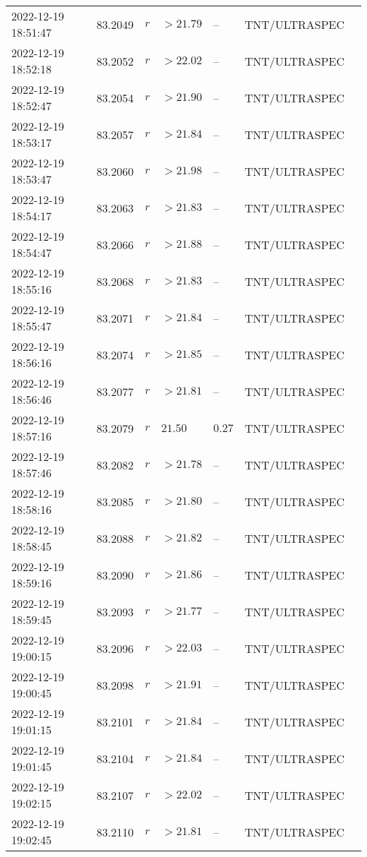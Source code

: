 \documentclass{nature_plusfigure}
\begin{document}
\begin{supplement}
\begin{center}
\begin{longtable}{lllllll}
2022-12-19 18:51:47 & 83.2049 & $r$ & $>21.79$ & -- & TNT/ULTRASPEC &  \\ 
2022-12-19 18:52:18 & 83.2052 & $r$ & $>22.02$ & -- & TNT/ULTRASPEC &  \\ 
2022-12-19 18:52:47 & 83.2054 & $r$ & $>21.90$ & -- & TNT/ULTRASPEC &  \\ 
2022-12-19 18:53:17 & 83.2057 & $r$ & $>21.84$ & -- & TNT/ULTRASPEC &  \\ 
2022-12-19 18:53:47 & 83.2060 & $r$ & $>21.98$ & -- & TNT/ULTRASPEC &  \\ 
2022-12-19 18:54:17 & 83.2063 & $r$ & $>21.83$ & -- & TNT/ULTRASPEC &  \\ 
2022-12-19 18:54:47 & 83.2066 & $r$ & $>21.88$ & -- & TNT/ULTRASPEC &  \\ 
2022-12-19 18:55:16 & 83.2068 & $r$ & $>21.83$ & -- & TNT/ULTRASPEC &  \\ 
2022-12-19 18:55:47 & 83.2071 & $r$ & $>21.84$ & -- & TNT/ULTRASPEC &  \\ 
2022-12-19 18:56:16 & 83.2074 & $r$ & $>21.85$ & -- & TNT/ULTRASPEC &  \\ 
2022-12-19 18:56:46 & 83.2077 & $r$ & $>21.81$ & -- & TNT/ULTRASPEC &  \\ 
2022-12-19 18:57:16 & 83.2079 & $r$ & $21.50$ & $0.27$ & TNT/ULTRASPEC &  \\ 
2022-12-19 18:57:46 & 83.2082 & $r$ & $>21.78$ & -- & TNT/ULTRASPEC &  \\ 
2022-12-19 18:58:16 & 83.2085 & $r$ & $>21.80$ & -- & TNT/ULTRASPEC &  \\ 
2022-12-19 18:58:45 & 83.2088 & $r$ & $>21.82$ & -- & TNT/ULTRASPEC &  \\ 
2022-12-19 18:59:16 & 83.2090 & $r$ & $>21.86$ & -- & TNT/ULTRASPEC &  \\ 
2022-12-19 18:59:45 & 83.2093 & $r$ & $>21.77$ & -- & TNT/ULTRASPEC &  \\ 
2022-12-19 19:00:15 & 83.2096 & $r$ & $>22.03$ & -- & TNT/ULTRASPEC &  \\ 
2022-12-19 19:00:45 & 83.2098 & $r$ & $>21.91$ & -- & TNT/ULTRASPEC &  \\ 
2022-12-19 19:01:15 & 83.2101 & $r$ & $>21.84$ & -- & TNT/ULTRASPEC &  \\ 
2022-12-19 19:01:45 & 83.2104 & $r$ & $>21.84$ & -- & TNT/ULTRASPEC &  \\ 
2022-12-19 19:02:15 & 83.2107 & $r$ & $>22.02$ & -- & TNT/ULTRASPEC &  \\ 
2022-12-19 19:02:45 & 83.2110 & $r$ & $>21.81$ & -- & TNT/ULTRASPEC &  \\ 

\end{longtable}
\end{center}
\end{supplement}
\end{document}
